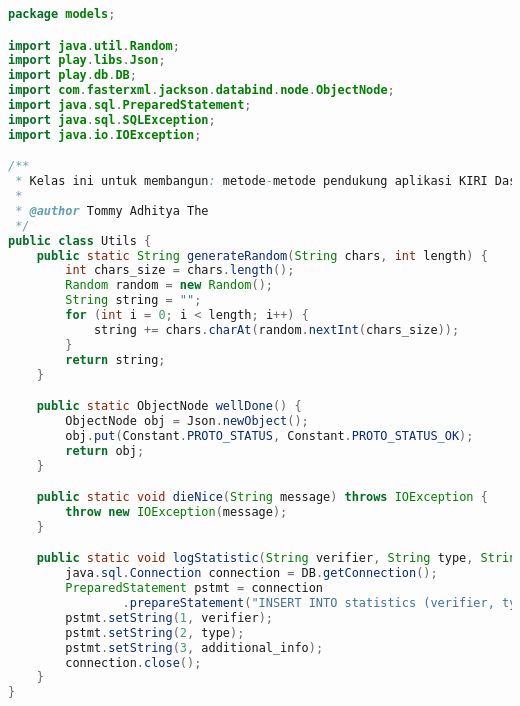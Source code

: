 \begin{lstlisting}[language=Java,basicstyle=\tiny,caption=models/Utils.java,label={lst:utils.java}]
package models;

import java.util.Random;
import play.libs.Json;
import play.db.DB;
import com.fasterxml.jackson.databind.node.ObjectNode;
import java.sql.PreparedStatement;
import java.sql.SQLException;
import java.io.IOException;

/**
 * Kelas ini untuk membangun: metode-metode pendukung aplikasi KIRI Dashboard
 * 
 * @author Tommy Adhitya The
 */
public class Utils {
	public static String generateRandom(String chars, int length) {
		int chars_size = chars.length();
		Random random = new Random();
		String string = "";
		for (int i = 0; i < length; i++) {
			string += chars.charAt(random.nextInt(chars_size));
		}
		return string;
	}

	public static ObjectNode wellDone() {
		ObjectNode obj = Json.newObject();
		obj.put(Constant.PROTO_STATUS, Constant.PROTO_STATUS_OK);
		return obj;
	}

	public static void dieNice(String message) throws IOException {
		throw new IOException(message);
	}

	public static void logStatistic(String verifier, String type, String additional_info) throws SQLException {
		java.sql.Connection connection = DB.getConnection();
		PreparedStatement pstmt = connection
				.prepareStatement("INSERT INTO statistics (verifier, type, additionalInfo) VALUES (?,?,?)");
		pstmt.setString(1, verifier);
		pstmt.setString(2, type);
		pstmt.setString(3, additional_info);
		connection.close();
	}
}
\end{lstlisting}